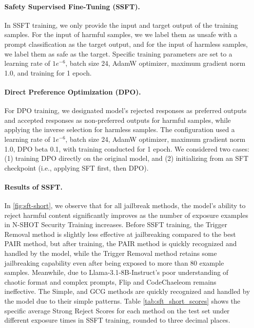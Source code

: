 \paragraph{Safety Supervised Fine-Tuning (SSFT).}
In SSFT training, we only provide the input and target output of the training samples.
For the input of harmful samples, we we label them as unsafe with a prompt classification as the target output, and for the input of harmless samples, we label them as safe as the target.
Specific training parameters are set to a learning rate of $1e^{-6}$, batch size 24, AdamW optimizer, maximum gradient norm 1.0, and training for 1 epoch.

\paragraph{Direct Preference Optimization (DPO).}
For DPO training, we designated model's rejected responses as preferred outputs and accepted responses as non-preferred outputs for harmful samples, while applying the inverse selection for harmless samples.
The configuration used a learning rate of $1e^{-6}$, batch size 24, AdamW optimizer, maximum gradient norm 1.0, DPO beta 0.1, with training conducted for 1 epoch.
We considered two cases: (1) training DPO directly on the original model, and (2) initializing from an SFT checkpoint (i.e., applying SFT first, then DPO). 

\paragraph{Results of SSFT.}
In \autoref{fig:sft-short}, we observe that for all jailbreak methods, the model's ability to reject harmful content significantly improves as the number of exposure examples in N-SHOT Security Training increases.
Before SSFT training, the Trigger Removal method is slightly less effective at jailbreaking compared to the best PAIR method, but after training, the PAIR method is quickly recognized and handled by the model, while the Trigger Removal method retains some jailbreaking capability even after being exposed to more than 80 example samples. Meanwhile, due to Llama-3.1-8B-Instruct's poor understanding of chaotic format and complex prompts, Flip and CodeChaeleom remains ineffective.
The Simple, and GCG methods are quickly recognized and handled by the model due to their simple patterns.
Table \ref{tab:sft_short_scores} shows the specific average Strong Reject Scores for each method on the test set under different exposure times in SSFT training, rounded to three decimal places.

